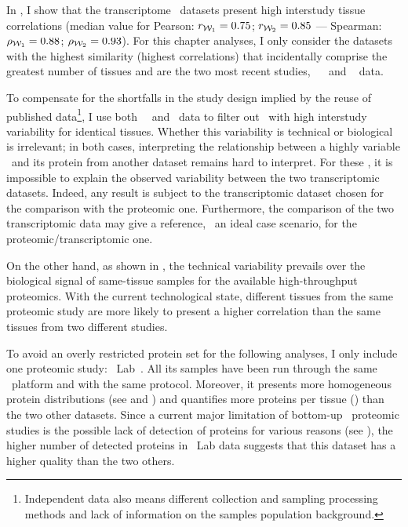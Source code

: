 In , I show that
the transcriptome \Rnaseq\ datasets present high interstudy tissue correlations
(median value for Pearson: $r_{\mathcal{W}_1}=0.75$; $r_{\mathcal{W}_2}=0.85$ ---
Spearman: $\rho_{\mathcal{W}_1}=0.88$; $\rho_{\mathcal{W}_2}=0.93$).
For this chapter analyses,
I only consider the datasets with the highest similarity
(highest correlations)
that incidentally comprise the greatest number of tissues
and are the two most recent studies,
\ie\ ~
and \gtex{}~ data.\mybr\

To compensate for the shortfalls in the study design implied
by the reuse of published data\footnote{%
Independent data also means
different collection and sampling processing methods and
lack of information on the samples population background.},
I use both \uhlen\ \etal\ and \gtex\ data
to filter out \mRNAs\ with high interstudy variability for identical tissues.
Whether this variability is technical or biological is irrelevant;
in both cases,
interpreting the relationship
between a highly variable \mRNAs\ and its protein from another dataset
remains hard to interpret.
For these \mRNAs,
it is impossible to explain the observed variability
between the two transcriptomic datasets.
Indeed, any result is subject to the transcriptomic dataset chosen
for the comparison with the proteomic one.
Furthermore, the comparison of the two transcriptomic data may give a reference,
\ie\ an ideal case scenario, for the proteomic/transcriptomic one.\mybr\

On the other hand,
as shown in ,
the technical variability prevails over
the biological signal of same-tissue samples
for the available high-throughput proteomics.
With the current technological state,
different tissues from the same proteomic study are more likely
to present a higher correlation
than the same tissues from two different studies.\mybr\

To avoid an overly restricted protein set for the following analyses,
I only include one proteomic study: \pandey\ Lab~.
All its samples have been run through the same \ms\ platform and
with the same protocol.
Moreover, it presents more homogeneous protein distributions
(see  and ) and
quantifies more proteins per tissue ()
than the two other datasets.
Since a current major limitation of bottom-up \ms\ proteomic studies
is the possible lack of detection of proteins for various reasons
(see ),
the higher number of detected proteins in \pandey\ Lab data suggests that
this dataset has a higher quality than the two others.\mybr\

